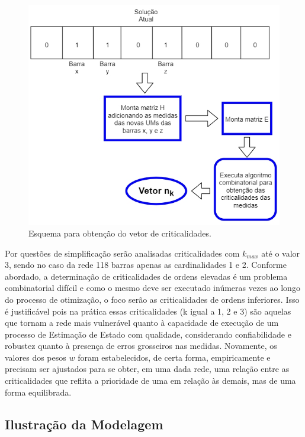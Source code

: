 \documentclass[12pt]{article}
\begin{document}
\begin{figure}[H]
	\centering 
	\includegraphics[scale=0.75]{figuras/Gera_nk.jpg}
	\caption{Esquema para obtenção do vetor de criticalidades.}
	\label{fig5} %
\end{figure}

Por questões de simplificação serão analisadas criticalidades com  $k_{max}$ até o valor 3, sendo no caso da rede 118 barras apenas as cardinalidades 1 e 2. Conforme abordado, a determinação de criticalidades de ordens elevadas é um problema combinatorial difícil e como o mesmo deve ser executado inúmeras vezes ao longo do processo de otimização, o foco serão as criticalidades de ordens inferiores. Isso é justificável pois na prática essas criticalidades (k igual a 1, 2 e 3) são aquelas que tornam a rede mais vulnerável quanto à capacidade de execução de um processo de Estimação de Estado com qualidade, considerando confiabilidade e robustez quanto à presença de erros grosseiros nas medidas. Novamente, os valores dos pesos $w$ foram estabelecidos, de certa forma, empiricamente e precisam ser ajustados para se obter, em uma dada rede, uma relação entre as criticalidades que reflita a prioridade de uma em relação às demais, mas de uma forma equilibrada.

\subsection{Ilustração da Modelagem}
\end{document}
